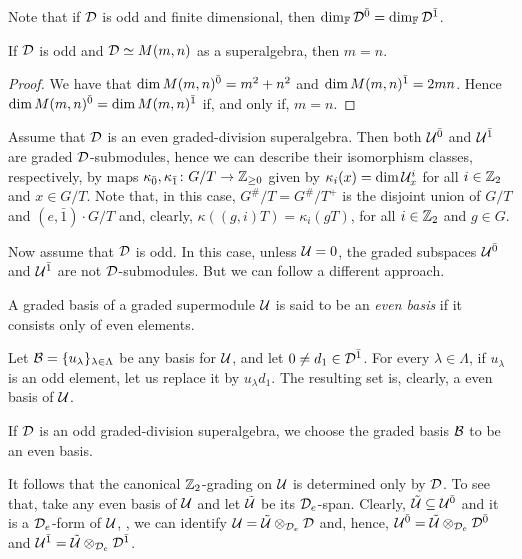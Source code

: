 Note that if $\mathcal{D}$ is odd and finite dimensional, then $\dim_{\mathbb{F}} \mathcal{D}^{\bar0} = \dim_{\mathbb{F}} \mathcal{D}^{\bar1}$. 

\begin{lemma}\label{lemma:odd-M-m=n}
    If $\mathcal{D}$ is odd and $\mathcal{D} \simeq M(m,n)$ as a superalgebra, then $m = n$. 
\end{lemma}

\begin{proof}
    We have that $\dim M(m,n)^{\bar0} = m^2 + n^2$ and $\dim M(m,n)^{\bar1} = 2mn$. 
    Hence $\dim M(m,n)^{\bar0} = \dim M(m,n)^{\bar1}$ if, and only if, $m=n$. 
\end{proof}

Assume that $\mathcal{D}$ is an even graded-division superalgebra. 
Then both $\mathcal U^{\bar0}$ and $\mathcal U^{\bar1}$ are graded $\mathcal{D}$-submodules, hence we can describe their isomorphism classes, respectively, by maps $\kappa_{\bar{0}}, \kappa_{\bar{1}}\colon G/T \to \mathbb{Z}_{\geq 0}$ given by $\kappa_i (x) = \dim \mathcal U^i_x$ for all $i\in \mathbb{Z}_2$ and $x\in G/T$. 
Note that, in this case, $G^\#/T = G^\#/T^+$ is the disjoint union of $G/T$ and $(e, \bar 1) \cdot G/T$ and, clearly, $\kappa ((g,i)T) = \kappa_i (gT)$, for all $i\in \mathbb{Z}_2$ and $g\in G$. 

Now assume that $\mathcal{D}$ is odd. 
In this case, unless $\mathcal U = 0$, the graded subspaces $\mathcal U^{\bar0}$ and $\mathcal U^{\bar1}$ are not $\mathcal{D}$-submodules. 
But we can follow a different approach.

\begin{defi}
    A graded basis of a graded supermodule $\mathcal U$ is said to be an \emph{even basis} if it consists only of even elements.
\end{defi}

Let $\mathcal B = \{u_\lambda\}_{\lambda \in \Lambda}$ be any basis for $\mathcal U$, and let $0 \neq d_1\in \mathcal{D}^{\bar1}$. 
For every $\lambda \in \Lambda$, if $u_\lambda$ is an odd element, let us replace it by $u_\lambda d_1$. 
The resulting set is, clearly, a even basis of $\mathcal U$. 

\begin{convention}\label{conv:pick-even-basis}
    If $\mathcal{D}$ is an odd graded-division superalgebra, we choose the graded basis $\mathcal B$ to be an even basis.
\end{convention}

It follows that the canonical $\mathbb{Z}_2$-grading on $\mathcal U$ is determined only by $\mathcal{D}$. 
To see that, take any even basis of $\mathcal U$ and let $\tilde {\mathcal U}$ be its $\mathcal{D}_e$-span. 
Clearly, $\tilde {\mathcal U} \subseteq \mathcal U^{\bar0}$ and it is a  $\mathcal{D}_e$-form of $\mathcal U$, \ie, we can identify $\mathcal U = \tilde{\mathcal U} \otimes_{\mathcal{D}_e} \mathcal{D}$ and, hence, $\mathcal U^{\bar0} = \tilde{\mathcal U} \otimes_{\mathcal{D}_e} \mathcal{D}^{\bar0}$ and  $\mathcal U^{\bar1} = \tilde{\mathcal U} \otimes_{\mathcal{D}_e} \mathcal{D}^{\bar1}$. 


